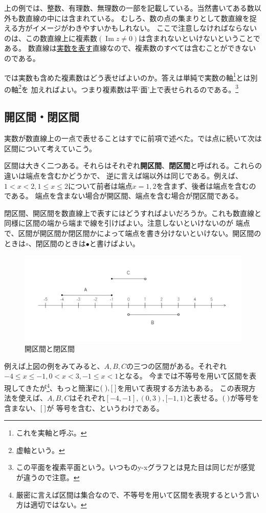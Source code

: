 \documentclass[a4j,dvipdfmx]{jsarticle}
\renewcommand{\Im}{\operatorname{Im}}
\begin{document}
            上の例では、整数、有理数、無理数の一部を記載している。当然書いてある数以外も数直線の中には含まれている。
            むしろ、数の点の集まりとして数直線を捉える方がイメージがわきやすいかもしれない。
            ここで注意しなければならないのは、この数直線上に複素数$(\Im z\neq 0)$は含まれないといけないということである。
            数直線は\underline{実数を表す}直線なので、複素数のすべては含むことができないのである。

            では実数も含めた複素数はどう表せばよいのか。答えは単純で実数の軸\footnote{これを実軸と呼ぶ。}とは別の軸\footnote{虚軸という。}を
            加えればよい。つまり複素数は平`面'上で表せられるのである。\footnote{この平面を複素平面という。いつものy-xグラフとは見た目は同じだが感覚が違うので注意。}  
            \newpage
        \subsection{開区間・閉区間}
            実数が数直線上の一点で表せることはすでに前項で述べた。では点に続いて次は区間について考えていこう。

            区間は大きく二つある。それらはそれぞれ\textbf{開区間}、\textbf{閉区間}と呼ばれる。これらの違いは端点を含むかどうかで、
            逆に言えば端以外は同じである。例えば、$1<x<2,1\leq x\leq2$について前者は端点$x=1,2$を含まず、後者は端点を含むのである。
            端点を含まない場合が開区間、端点を含む場合が閉区間である。

            閉区間、開区間を数直線上で表すにはどうすればよいだろうか。これも数直線と同様に区間の端から端まで線を引けばよい。注意しないといけないのが
            端点で、区間が開区間か閉区間かによって端点を書き分けないといけない。開区間のときは$\circ$、閉区間のときは$\bullet$と書けばよい。

            \begin{figure}[h]
                \centering
                \includegraphics[keepaspectratio,scale=0.7]{img/QuuNote/IntervalLine.png}
                \caption{開区間と閉区間}
            \end{figure}
            例えば上図の例をみてみると、$A,B,C$の三つの区間がある。それぞれ$-4\leq x\leq -1,0<x<3,-1\leq x<1$となる。
            今までは不等号を用いて区間を表現してきたが\footnote{厳密に言えば区間は集合なので、不等号を用いて区間を表現するという言い方は適切ではない。}、もっと簡潔に$(\hspace{1mm}),[\hspace{1mm}]$を用いて表現する方法もある。
            この表現方法を使えば、$A,B,C$はそれぞれ$[-4,-1],(0,3),[-1,1)$と表せる。$(\hspace{1mm})$が等号を含まない、$[\hspace{1mm}]$が
            等号を含む、というわけである。
\end{document}
